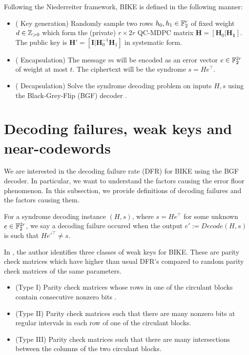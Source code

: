 Following the Niederreiter framework, BIKE is defined in the following manner:

\begin{itemize}
\item ( Key generation) Randomly sample two rows $h_0, h_1 \in \mathbb{F}_2^r$ of fixed weight $d \in \mathbb{Z}_{> 0}$ which form the (private) $r \times 2r$ QC-MDPC matrix $\mathbf{H} = [ \mathbf{H}_0 | \mathbf{H_1}]$. The public key is $\mathbf{H}' = [\mathbf{I} | \mathbf{H}_0^{-1}\mathbf{H}_1]$ in systematic form.
\item ( Encapsulation) The message $m$ will be encoded as an error vector $e \in \mathbb{F}_2^{2r}$ of weight at  most $t$. The ciphertext will be the syndrome $s = He^\top$.
\item ( Decapsulation) Solve the syndrome decoding problem on inputs $H,s$ using the Black-Grey-Flip (BGF) decoder \cite{bgf}.
\end{itemize}


\section{Decoding failures, weak keys and near-codewords}

We are interested in the decoding failure rate (DFR) for BIKE using the BGF decoder. In particular, we want to understand the factors causing the error floor phenomenon. In this subsection, we provide definitions of decoding failures and the factors causing them.

\begin{defn}
For a syndrome decoding instance $(H,s)$, where $s = He^\top$ for some unknown $e \in \mathbb{F}_2^{2r}$, we say a decoding failure occured when the output $e' := Decode(H,s)$ is such that $He'^\top \neq s$.
\end{defn}

In \cite{Vasseur-thesis}, the author identifies three classes of weak keys for BIKE. These are parity check matrices which have higher than usual DFR's compared to random parity check matrices of the same parameters.

\begin{itemize}
\item (Type I) Parity check matrices whose rows in one of the circulant blocks contain consecutive nonzero bits \cite{DGK20b}.
\item (Type II) Parity check matrices such that there are many nonzero bits at regular intervals in each row of one of the circulant blocks.
\item (Type III) Parity check matrices such that there are many intersections between the columns of the two circulant blocks.
\end{itemize}


